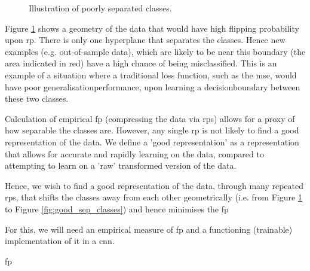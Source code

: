 \begin{figure}[ht]
\caption{Illustration of poorly separated classes.}
\label{fig:poor_sep_classes}
\end{figure}

Figure \ref{fig:poor_sep_classes} shows a geometry of the data that would have high flipping probability upon \gls{rp}. There is only one \gls{hyperplane} that separates the classes. Hence new examples (e.g. out-of-sample data), which are likely to be near this boundary (the area indicated in red) have a high chance of being misclassified. This is an example of a situation where a traditional loss function, such as the \gls{mse}, would have poor \gls{generalisationperformance}, upon learning a \gls{decisionboundary} between these two classes. \bigskip

Calculation of empirical \gls{fp} (compressing the data via \gls{rp}s) allows for a proxy of how separable the classes are. However, any single \gls{rp} is not likely to find a good representation of the data. We define a 'good representation' as a representation that allows for accurate and rapidly learning on the data, compared to attempting to learn on a 'raw' transformed version of the data.


Hence, we wish to find a good representation of the data, through many repeated  \gls{rp}s, that shifts the classes away from each other geometrically (i.e. from Figure \ref{fig:poor_sep_classes} to Figure \ref{fig:good_sep_classes}) and hence minimises the \gls{fp} \bigskip

For this, we will need an empirical measure of \gls{fp} and a functioning (trainable) implementation of it in a \gls{cnn}. \bigskip

\gls{fp}